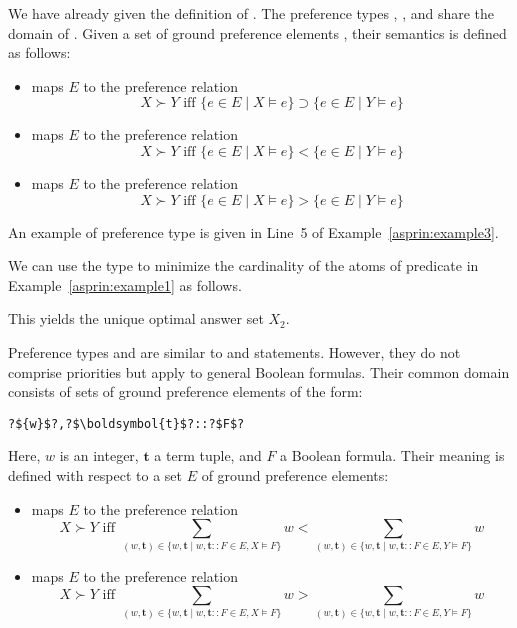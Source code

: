 We have already given the definition of . 
The preference types , , and  share the domain of .
Given a set of ground preference elements ,
their semantics is defined as follows:
\begin{itemize}
\item
{} maps $E$ to the preference relation
\[
X \succ Y \text{ iff } \{e\in E\mid X\models e\}\supset\{e\in E\mid Y\models e\}
\]
\item
{} maps $E$ to the preference relation
\[
X \succ Y \text{ iff } \{e\in E\mid X\models e\}<\{e\in E\mid Y\models e\}
\]
\item
{} maps $E$ to the preference relation
\[
X \succ Y \text{ iff } \{e\in E\mid X\models e\}>\{e\in E\mid Y\models e\}
\]
\end{itemize}
An example of preference type  is given in Line~5 of Example~\ref{asprin:example3}.
%
\begin{example}
We can use the type  to minimize the cardinality of the atoms of predicate 
in Example~\ref{asprin:example1} as follows.
%

%
This yields the unique optimal answer set $X_2$.
\end{example}

Preference types  and 
are similar to  and  statements.
However, they do not comprise priorities but apply to general Boolean formulas.
Their common domain consists of sets of ground preference elements of the form:
\begin{lstlisting}[numbers=none,escapechar=?]
?${w}$?,?$\boldsymbol{t}$?::?$F$?
\end{lstlisting}
Here, ${w}$ is an integer, $\boldsymbol{t}$ a term tuple, and $F$ a Boolean formula. 
%
Their meaning is defined with respect to a set $E$ of ground preference elements:
\begin{itemize}
\item
{} maps $E$ to the preference relation
\[
X \succ Y 
\text{ iff }
\sum_{(w,\boldsymbol{t})\in\{w,\boldsymbol{t}\mid w,\boldsymbol{t}\mathtt{::}F\in E, X\models F\}}w
<
\sum_{(w,\boldsymbol{t})\in\{w,\boldsymbol{t}\mid w,\boldsymbol{t}\mathtt{::}F\in E, Y\models F\}}w
\]
\item
{} maps $E$ to the preference relation
\[
X \succ Y 
\text{ iff }
\sum_{(w,\boldsymbol{t})\in\{w,\boldsymbol{t}\mid w,\boldsymbol{t}\mathtt{::}F\in E, X\models F\}}w
>
\sum_{(w,\boldsymbol{t})\in\{w,\boldsymbol{t}\mid w,\boldsymbol{t}\mathtt{::}F\in E, Y\models F\}}w
\]
\end{itemize}

